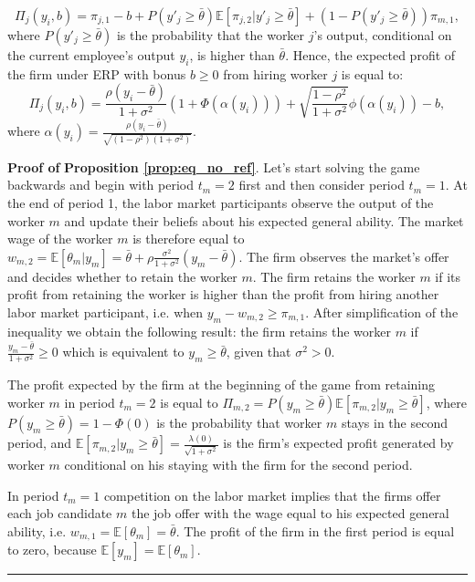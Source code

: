 \documentclass[12pt]{article}
\newenvironment{proof}[1][Proof of]{\noindent\textbf{#1} }{\ \rule{0.5em}{0.5em}}
\begin{document}
\begin{itemize}
    \begin{equation*}
        \Pi_j(y_i, b) = \pi_{j,1} - b + P\left( y'_j \geq \bar{\theta} \right) \mathbb {E}[\pi_{j,2} | y'_j \geq \bar{\theta}] 
        + (1 - P\left( y'_j \geq \bar{\theta} \right)) \pi_{m,1},
    \end{equation*}
    where $P\left( y'_j \geq \bar{\theta} \right)$ is the probability that the worker $j$'s output, conditional on the current employee's output $y_i$, is higher than $\bar{\theta}$. Hence, the expected profit of the firm under ERP with bonus $b \geq 0$ from hiring worker $j$ is equal to:
    \begin{equation}\label{eq_pi_j_y_i_b}
        \Pi_j(y_i, b) = \frac{\rho\left(y_i-\bar{\theta}\right)}{1+\sigma^2}\left(1+\Phi\left(\alpha(y_i)\right)\right)
        + \sqrt{\frac{1-\rho^2}{1+\sigma^2}}\phi\left(\alpha(y_i)\right) - b,
    \end{equation}
    where $\alpha(y_i) = \frac{\rho\left(y_i - \bar{\theta}\right)}{\sqrt{(1-\rho^2)(1+\sigma^2)}}$.
\end{itemize}

\begin{proof}
    \textbf{Proposition \ref{prop:eq_no_ref}}. 
    Let's start solving the game backwards and begin with period $t_m = 2$ first and then consider period $t_m = 1$. At the end of period 1, the labor market participants observe the output of the worker $m$  and update their beliefs about his expected general ability. The market wage of the worker $m$ is therefore equal to $w_{m,2} = \mathbb{E}[\theta_m | y_m] = \bar{\theta} + \rho\frac{\sigma^2}{1+\sigma^2}(y_m - \bar{\theta})$. The firm observes the market's offer and decides whether to retain the worker $m$. The firm retains the worker $m$ if its profit from retaining the worker is higher than the profit from hiring another labor market participant, i.e. when $y_m - w_{m,2} \geq \pi_{m,1}$. After simplification of the inequality we obtain the following result: the firm retains the worker $m$ if $\frac{y_m - \bar{\theta}}{1+\sigma^2} \geq 0$ which is equivalent to $y_m \geq \bar{\theta}$, given that $\sigma^2 >0$. 
    
    The profit expected by the firm at the beginning of the game from retaining worker $m$ in period $t_m = 2$ is equal to $\Pi_{m,2} = P(y_m \geq \bar{\theta})\mathbb{E}[\pi_{m,2}|y_m \geq \bar{\theta}]$, where $P(y_m \geq \bar{\theta}) = 1-\Phi(0)$ is the probability that worker $m$ stays in the second period, and $\mathbb{E}[\pi_{m,2}|y_m \geq \bar{\theta}] = \frac{\lambda(0)}{\sqrt{1+\sigma^2}}$ is the firm's expected profit generated by worker $m$ conditional on his staying with the firm for the second period.  
    
    In period $t_m = 1$ competition on the labor market implies that the firms offer each job candidate $m$ the job offer with the wage equal to his expected general ability, i.e. $w_{m,1} = \mathbb{E}[\theta_m] = \bar{\theta}$. The profit of the firm in the first period is equal to zero, because $\mathbb{E}[y_m] = \mathbb{E}[\theta_m]$. 
\end{proof}
\end{document}
